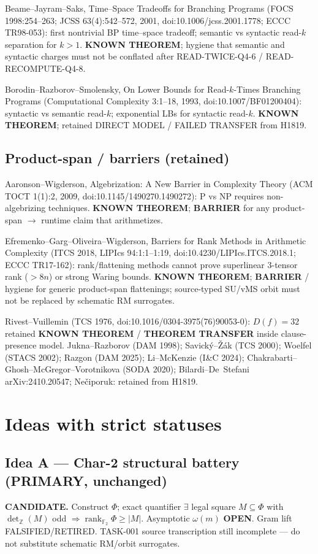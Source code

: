 \documentclass[11pt]{article}
\begin{document}
Beame--Jayram--Saks, Time--Space Tradeoffs for Branching Programs
(FOCS 1998:254--263; JCSS 63(4):542--572, 2001, doi:10.1006/jcss.2001.1778; ECCC TR98-053):
first nontrivial BP time--space tradeoff; semantic vs syntactic read-$k$ separation for $k>1$.
\textbf{KNOWN THEOREM}; hygiene that semantic and syntactic charges must not be conflated
after READ-TWICE-Q4-6 / READ-RECOMPUTE-Q4-8.

Borodin--Razborov--Smolensky, On Lower Bounds for Read-$k$-Times Branching Programs
(Computational Complexity 3:1--18, 1993, doi:10.1007/BF01200404):
syntactic vs semantic read-$k$; exponential LBs for syntactic read-$k$.
\textbf{KNOWN THEOREM}; retained DIRECT MODEL / FAILED TRANSFER from H1819.

\subsection*{Product-span / barriers (retained)}
Aaronson--Wigderson, Algebrization: A New Barrier in Complexity Theory
(ACM TOCT 1(1):2, 2009, doi:10.1145/1490270.1490272): P vs NP requires non-algebrizing
techniques.
\textbf{KNOWN THEOREM}; \textbf{BARRIER} for any product-span $\to$ runtime claim that
arithmetizes.

Efremenko--Garg--Oliveira--Wigderson, Barriers for Rank Methods in Arithmetic Complexity
(ITCS 2018, LIPIcs 94:1:1--1:19, doi:10.4230/LIPIcs.ITCS.2018.1; ECCC TR17-162):
rank/flattening methods cannot prove superlinear 3-tensor rank ($>8n$) or strong Waring
bounds.
\textbf{KNOWN THEOREM}; \textbf{BARRIER} / hygiene for generic product-span flattenings;
source-typed SU/vMS orbit must not be replaced by schematic RM surrogates.

Rivest--Vuillemin (TCS 1976, doi:10.1016/0304-3975(76)90053-0): $D(f)=32$ retained
\textbf{KNOWN THEOREM} / \textbf{THEOREM TRANSFER} inside clause-presence model.
Jukna--Razborov (DAM 1998); Savick\'y--\v{Z}\'ak (TCS 2000); Woelfel (STACS 2002);
Razgon (DAM 2025); Li--McKenzie (I\&C 2024); Chakrabarti--Ghosh--McGregor--Vorotnikova
(SODA 2020); Bilardi--De~Stefani arXiv:2410.20547; Ne\v{c}iporuk: retained from H1819.

\section*{Ideas with strict statuses}
\subsection*{Idea A --- Char-2 structural battery (PRIMARY, unchanged)}
\textbf{CANDIDATE.} Construct $\Phi$; exact quantifier
$\exists$ legal square $M\subseteq\Phi$ with $\det_{\mathbb Z}(M)$ odd
$\Rightarrow\operatorname{rank}_{\mathbb F_2}\Phi\ge|M|$. Asymptotic $\omega(m)$ \textbf{OPEN}.
Gram lift FALSIFIED/RETIRED. TASK-001 source transcription still incomplete --- do not
substitute schematic RM/orbit surrogates.
\end{document}
